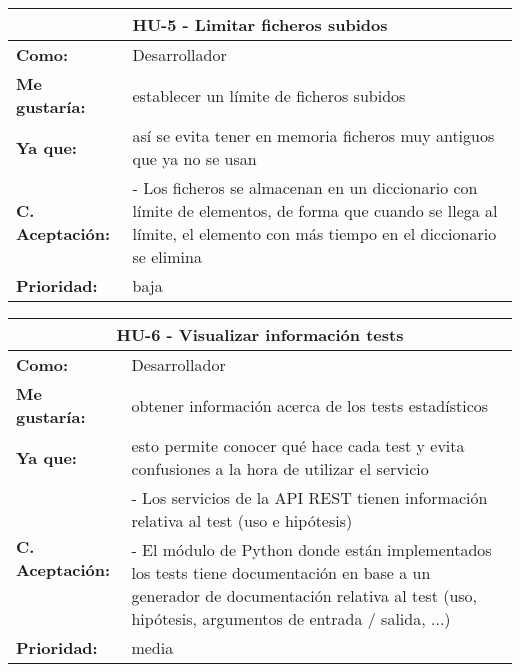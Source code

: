 	

\begin{table}[H]
	\begin{tabular}{| p{3cm}| p{11cm} |}
		\hline
		\multicolumn{2}{|c|}{\textbf{HU-5} - Limitar ficheros subidos} \\ \hline
		\textbf{Como:} & Desarrollador \\ \hline
		\textbf{Me gustaría:} & establecer un límite de ficheros subidos \\ \hline
		\textbf{Ya que:} & así se evita tener en memoria ficheros muy antiguos que ya no se usan \\ \hline
		\textbf{C. Aceptación:} & - Los ficheros se almacenan en un diccionario con límite de elementos, de forma que cuando se llega al límite, el elemento con más tiempo en el diccionario se elimina \\ \hline
		\textbf{\textbf{Prioridad:}} & baja \\ \hline
	\end{tabular}
\end{table}


\begin{table}[H]
	\begin{tabular}{| p{3cm}| p{11cm} |}
		\hline
		\multicolumn{2}{|c|}{\textbf{HU-6} - Visualizar información tests} \\ \hline
		\textbf{Como:} & Desarrollador \\ \hline
		\textbf{Me gustaría:} & obtener información acerca de los tests estadísticos \\ \hline
		\textbf{Ya que:} & esto permite conocer qué hace cada test y evita confusiones a la hora de utilizar el servicio \\ \hline
		\multirow{2}{11cm}{\textbf{C. Aceptación:}} & - Los servicios de la API REST tienen información relativa al test (uso e hipótesis) \\
		& - El módulo de Python donde están implementados los tests tiene documentación en base a un generador de documentación relativa al test (uso, hipótesis, argumentos de entrada / salida, ...) \\ \hline 
		\textbf{\textbf{Prioridad:}} & media \\ \hline
	\end{tabular}
\end{table}


